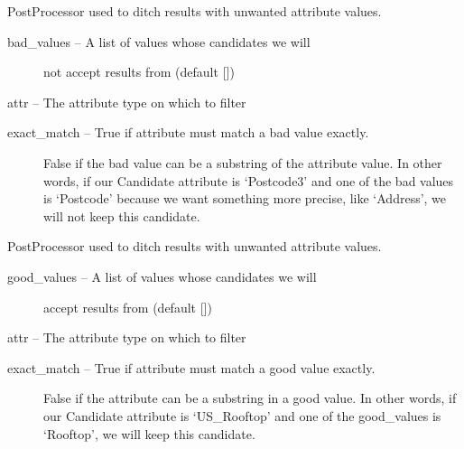 \documentclass[letterpaper,10pt,english]{sphinxmanual}
\begin{document}
\begin{fulllineitems}
\label{index:omgeo.processors.postprocessors.AttrExclude}
PostProcessor used to ditch results with unwanted attribute values.
\begin{description}
\item[{bad\_values   --  A list of values whose candidates we will}] \leavevmode
not accept results from (default {[}{]})

\end{description}

attr         --  The attribute type on which to filter
\begin{description}
\item[{exact\_match  --  True if attribute must match a bad value exactly.}] \leavevmode
False if the bad value can be a substring of the
attribute value. In other words, if our Candidate
attribute is `Postcode3' and one of the bad values
is `Postcode' because we want something more precise,
like `Address', we will not keep this candidate.

\end{description}

\end{fulllineitems}


\begin{fulllineitems}
\label{index:omgeo.processors.postprocessors.AttrFilter}
PostProcessor used to ditch results with unwanted attribute values.
\begin{description}
\item[{good\_values   --  A list of values whose candidates we will}] \leavevmode
accept results from (default {[}{]})

\end{description}

attr          --  The attribute type on which to filter
\begin{description}
\item[{exact\_match   --  True if attribute must match a good value exactly.}] \leavevmode
False if the attribute can be a substring in a
good value. In other words, if our Candidate
attribute is `US\_Rooftop' and one of the good\_values
is `Rooftop', we will keep this candidate.

\end{description}

\end{fulllineitems}
\end{document}
